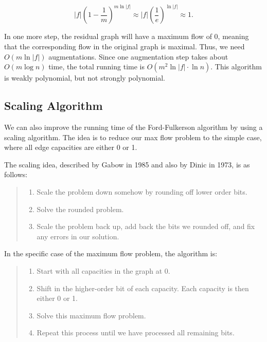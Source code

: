 \documentclass{article}
\begin{document}
\[|f| \left(1-\frac{1}{m}\right)^{m\ln |f|}\approx
|f|  \left(\frac{1}{e}\right)^{\ln |f|}\approx 1.\]

 In one more step, the residual
graph will have a maximum flow of 0, meaning that the corresponding
flow in the original graph is maximal. Thus, we need $O(m\ln |f|)$
augmentations.  Since one augmentation step takes about $O(m\log
n)$ time, the total running time is $O(m^2 \ln|f| \cdot \ln n)$.  
This algorithm is weakly polynomial, but not strongly polynomial.

\subsection{Scaling Algorithm}

We can also improve the running time of the Ford-Fulkerson algorithm
by using a scaling algorithm.  The idea is to reduce our max flow
problem to the simple case, where all edge capacities are either 0 or 1.

The scaling idea, described by Gabow in 1985 and also by Dinic in
1973, is as follows:

\begin{quote}
\begin{enumerate}
\item
Scale the problem down somehow by rounding off lower order bits.

\item
Solve the rounded problem.

\item
Scale the problem back up, add back the bits we rounded off, and fix
any errors in our solution.
\end{enumerate}
\end{quote}

In the specific case of the maximum flow problem, the algorithm is:

\begin{quote}
\begin{enumerate}
\item
Start with all capacities in the graph at 0.
\item
Shift in the higher-order bit of each capacity.  Each capacity is then
either 0 or 1.
\item
Solve this maximum flow problem.
\item
Repeat this process until we have processed all remaining bits.
\end{enumerate}
\end{quote}
\end{document}
